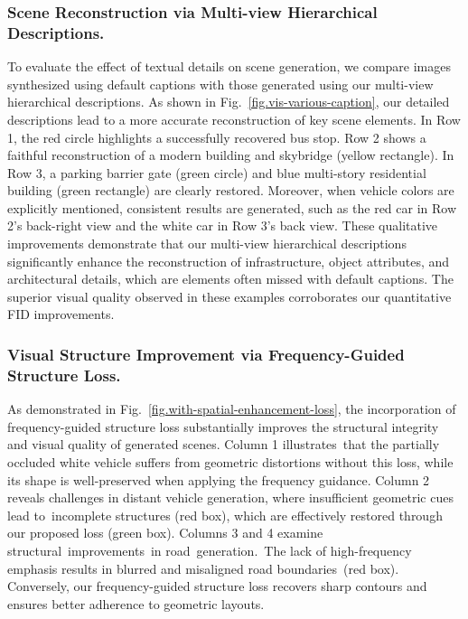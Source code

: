 \subsubsection{Scene Reconstruction via Multi-view Hierarchical Descriptions.}
To evaluate the effect of textual details on scene generation, we compare images synthesized using default captions with those generated using our multi-view hierarchical descriptions. 
As shown in Fig.~\ref{fig.vis-various-caption}, our detailed descriptions lead to a more accurate reconstruction of key scene elements.
In Row 1, the red circle highlights a successfully recovered bus stop.
Row 2 shows a faithful reconstruction of a modern building and skybridge (yellow rectangle). 
In Row 3, a parking barrier gate (green circle) and blue multi-story residential building (green rectangle) are clearly restored. 
Moreover, when vehicle colors are explicitly mentioned, consistent results are generated, such as the red car in Row 2's back-right view and the white car in Row 3's back view.
These qualitative improvements demonstrate that our multi-view hierarchical descriptions significantly enhance the reconstruction of infrastructure, object attributes, and architectural details, which are elements often missed with default captions.
The superior visual quality observed in these examples corroborates our quantitative FID improvements.
\subsubsection{Visual Structure Improvement via Frequency-Guided Structure Loss. }
As demonstrated in Fig.~\ref{fig.with-spatial-enhancement-loss}, the incorporation of frequency-guided structure loss substantially improves the structural integrity and visual quality of generated scenes. 
Column 1 illustrates that the partially occluded white vehicle suffers from geometric distortions without this loss, while its shape is well-preserved when applying the frequency guidance. 
Column 2 reveals challenges in distant vehicle generation, where insufficient geometric cues lead to incomplete structures (red box), which are effectively restored through our proposed loss (green box).
Columns 3 and 4 examine structural improvements in road generation. The lack of high-frequency emphasis results in blurred and misaligned road boundaries (red box). 
Conversely, our frequency-guided structure loss recovers sharp contours and ensures better adherence to geometric layouts.
